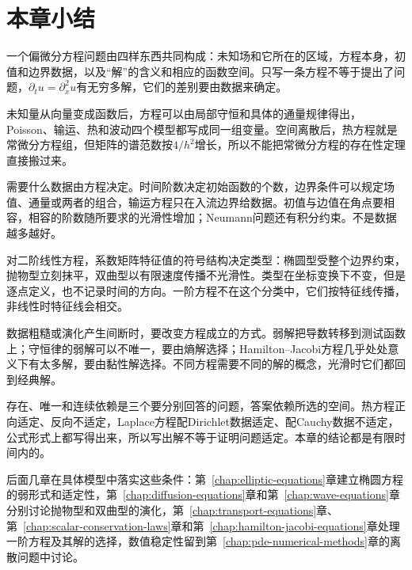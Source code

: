 \section{本章小结}
\label{sec:pdeprob-summary}

一个偏微分方程问题由四样东西共同构成：未知场和它所在的区域，方程本身，初值和边界数据，以及“解”的含义和相应的函数空间。只写一条方程不等于提出了问题，$\partial_tu=\partial_x^{2}u$有无穷多解，它们的差别要由数据来确定。

未知量从向量变成函数后，方程可以由局部守恒和具体的通量规律得出，Poisson、输运、热和波动四个模型都写成同一组变量。空间离散后，热方程就是常微分方程组，但矩阵的谱范数按$4/h^{2}$增长，所以不能把常微分方程的存在性定理直接搬过来。

需要什么数据由方程决定。时间阶数决定初始函数的个数，边界条件可以规定场值、通量或两者的组合，输运方程只在入流边界给数据。初值与边值在角点要相容，相容的阶数随所要求的光滑性增加；Neumann问题还有积分约束。不是数据越多越好。

对二阶线性方程，系数矩阵特征值的符号结构决定类型：椭圆型受整个边界约束，抛物型立刻抹平，双曲型以有限速度传播不光滑性。类型在坐标变换下不变，但是逐点定义，也不记录时间的方向。一阶方程不在这个分类中，它们按特征线传播，非线性时特征线会相交。

数据粗糙或演化产生间断时，要改变方程成立的方式。弱解把导数转移到测试函数上；守恒律的弱解可以不唯一，要由熵解选择；Hamilton--Jacobi方程几乎处处意义下有太多解，要由黏性解选择。不同方程需要不同的解的概念，光滑时它们都回到经典解。

存在、唯一和连续依赖是三个要分别回答的问题，答案依赖所选的空间。热方程正向适定、反向不适定，Laplace方程配Dirichlet数据适定、配Cauchy数据不适定，公式形式上都写得出来，所以写出解不等于证明问题适定。本章的结论都是有限时间内的。

后面几章在具体模型中落实这些条件：第~\ref{chap:elliptic-equations}章建立椭圆方程的弱形式和适定性，第~\ref{chap:diffusion-equations}章和第~\ref{chap:wave-equations}章分别讨论抛物型和双曲型的演化，第~\ref{chap:transport-equations}章、第~\ref{chap:scalar-conservation-laws}章和第~\ref{chap:hamilton-jacobi-equations}章处理一阶方程及其解的选择，数值稳定性留到第~\ref{chap:pde-numerical-methods}章的离散问题中讨论。
